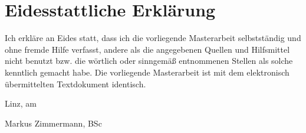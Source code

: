 




\chapter*{Eidesstattliche Erklärung}

Ich erkläre an Eides statt, dass ich die vorliegende Masterarbeit selbstständig und ohne fremde Hilfe verfasst, andere als die angegebenen Quellen und Hilfsmittel nicht benutzt bzw. die wörtlich oder sinngemäß entnommenen Stellen als solche kenntlich gemacht habe. Die vorliegende Masterarbeit ist mit dem elektronisch übermittelten Textdokument identisch.

Linz, am  \begin{flushright}Markus Zimmermann, BSc\end{flushright}


